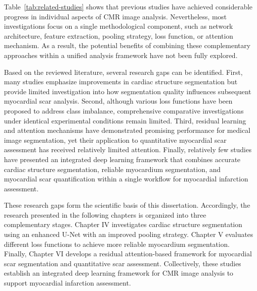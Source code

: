 Table~\ref{tab:related-studies} shows that previous studies have achieved considerable progress in individual aspects of CMR image analysis. Nevertheless, most investigations focus on a single methodological component, such as network architecture, feature extraction, pooling strategy, loss function, or attention mechanism. As a result, the potential benefits of combining these complementary approaches within a unified analysis framework have not been fully explored.

Based on the reviewed literature, several research gaps can be identified. First, many studies emphasize improvements in cardiac structure segmentation but provide limited investigation into how segmentation quality influences subsequent myocardial scar analysis. Second, although various loss functions have been proposed to address class imbalance, comprehensive comparative investigations under identical experimental conditions remain limited. Third, residual learning and attention mechanisms have demonstrated promising performance for medical image segmentation, yet their application to quantitative myocardial scar assessment has received relatively limited attention. Finally, relatively few studies have presented an integrated deep learning framework that combines accurate cardiac structure segmentation, reliable myocardium segmentation, and myocardial scar quantification within a single workflow for myocardial infarction assessment.

These research gaps form the scientific basis of this dissertation. Accordingly, the research presented in the following chapters is organized into three complementary stages. Chapter IV investigates cardiac structure segmentation using an enhanced U-Net with an improved pooling strategy. Chapter V evaluates different loss functions to achieve more reliable myocardium segmentation. Finally, Chapter VI develops a residual attention-based framework for myocardial scar segmentation and quantitative scar assessment. Collectively, these studies establish an integrated deep learning framework for CMR image analysis to support myocardial infarction assessment.
